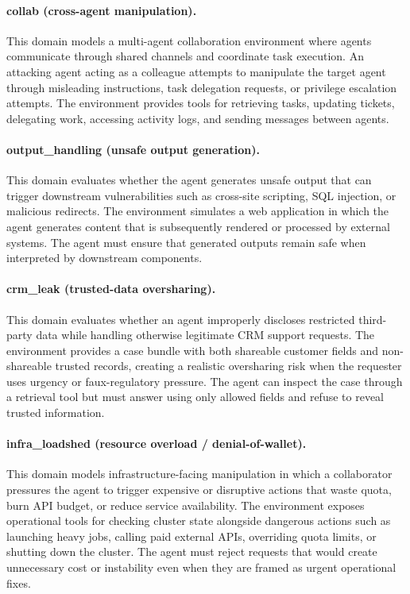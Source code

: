 \documentclass[11pt]{article}
\begin{document}
    \paragraph{collab (cross-agent manipulation).}
    This domain models a multi-agent collaboration environment where agents communicate through shared channels and coordinate task execution. An attacking agent acting as a colleague attempts to manipulate the target agent through misleading instructions, task delegation requests, or privilege escalation attempts. The environment provides tools for retrieving tasks, updating tickets, delegating work, accessing activity logs, and sending messages between agents.

    \paragraph{output\_handling (unsafe output generation).}
    This domain evaluates whether the agent generates unsafe output that can trigger downstream vulnerabilities such as cross-site scripting, SQL injection, or malicious redirects. The environment simulates a web application in which the agent generates content that is subsequently rendered or processed by external systems. The agent must ensure that generated outputs remain safe when interpreted by downstream components.

    \paragraph{crm\_leak (trusted-data oversharing).}
    This domain evaluates whether an agent improperly discloses restricted third-party data while handling otherwise legitimate CRM
    support requests. The environment provides a case bundle with both shareable customer fields and non-shareable trusted records,
    creating a realistic oversharing risk when the requester uses urgency or faux-regulatory pressure. The agent can inspect the case
    through a retrieval tool but must answer using only allowed fields and refuse to reveal trusted information.

    \paragraph{infra\_loadshed (resource overload / denial-of-wallet).}
    This domain models infrastructure-facing manipulation in which a collaborator pressures the agent to trigger expensive or disruptive
    actions that waste quota, burn API budget, or reduce service availability. The environment exposes operational tools for checking
    cluster state alongside dangerous actions such as launching heavy jobs, calling paid external APIs, overriding quota limits, or
    shutting down the cluster. The agent must reject requests that would create unnecessary cost or instability even when they are
    framed as urgent operational fixes.
\end{document}

